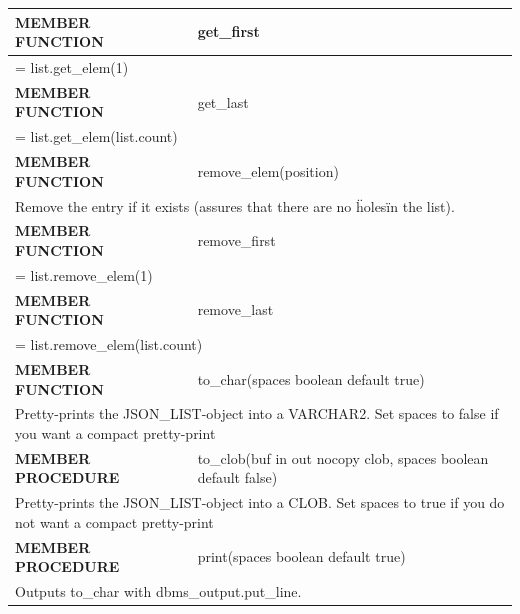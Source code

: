 \documentclass[11pt,twocolumn, a4paper]{article}
\begin{document}
\begin{longtable}{| l | l |}
\hline
  \textbf{MEMBER FUNCTION} & get\_first\\
\hline
  \multicolumn{2}{|p{15cm}|}{ = list.get\_elem(1)} \\
\hline
\hline
  \textbf{MEMBER FUNCTION} & get\_last\\
\hline
  \multicolumn{2}{|p{15cm}|}{ = list.get\_elem(list.count)} \\
\hline

\hline
  \textbf{MEMBER FUNCTION} & remove\_elem(position)\\
\hline
  \multicolumn{2}{|p{15cm}|}{Remove the entry if it exists (assures that there are no \"holes\" in the list).} \\
\hline

\hline
  \textbf{MEMBER FUNCTION} & remove\_first\\
\hline
  \multicolumn{2}{|p{15cm}|}{ = list.remove\_elem(1)} \\
\hline
\hline
  \textbf{MEMBER FUNCTION} & remove\_last\\
\hline
  \multicolumn{2}{|p{15cm}|}{ = list.remove\_elem(list.count)} \\
\hline

\hline
  \textbf{MEMBER FUNCTION} & to\_char(spaces boolean default true)\\
\hline
  \multicolumn{2}{|p{15cm}|}{Pretty-prints the JSON\_LIST-object into a VARCHAR2. Set spaces to false if you want a compact pretty-print} \\
\hline

\hline
  \textbf{MEMBER PROCEDURE} & to\_clob(buf in out nocopy clob, spaces boolean default false)\\
\hline
  \multicolumn{2}{|p{15cm}|}{Pretty-prints the JSON\_LIST-object into a CLOB. Set spaces to true if you do not want a compact pretty-print} \\
\hline

\hline
  \textbf{MEMBER PROCEDURE} & print(spaces boolean default true)\\
\hline
  \multicolumn{2}{|p{15cm}|}{Outputs to\_char with dbms\_output.put\_line.} \\
\hline

\end{longtable}
\end{document}

